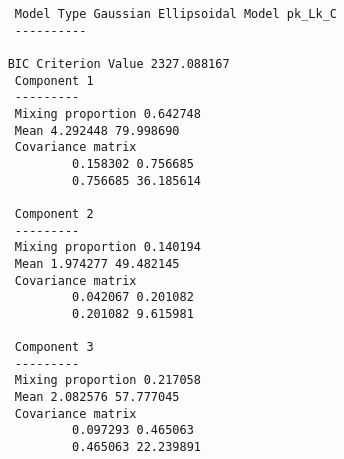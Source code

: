{\begin{verbatim}
                        Model Type Gaussian Ellipsoidal Model pk_Lk_C
                        ----------

                       BIC Criterion Value 2327.088167
                        Component 1
                        ---------
                        Mixing proportion 0.642748
                        Mean 4.292448 79.998690
                        Covariance matrix
                                0.158302 0.756685
                                0.756685 36.185614

                        Component 2
                        ---------
                        Mixing proportion 0.140194
                        Mean 1.974277 49.482145
                        Covariance matrix
                                0.042067 0.201082
                                0.201082 9.615981

                        Component 3
                        ---------
                        Mixing proportion 0.217058
                        Mean 2.082576 57.777045
                        Covariance matrix
                                0.097293 0.465063
                                0.465063 22.239891
\end{verbatim}}
